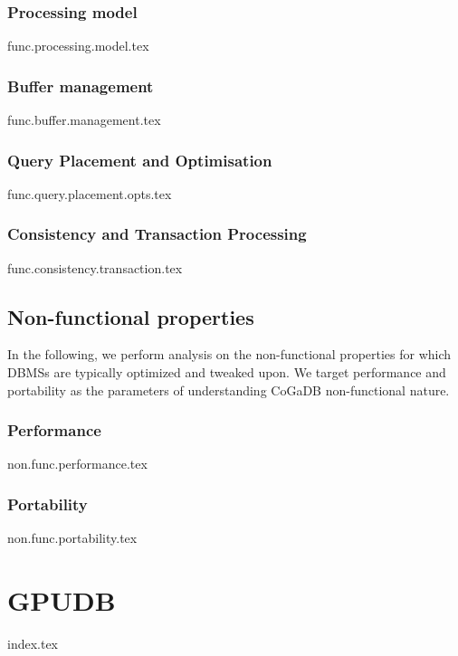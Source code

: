 \documentclass[a4paper, 11pt]{article}
\begin{document}
\subsubsection*{Processing model}
{func.processing.model.tex}

\subsubsection*{Buffer management}
{func.buffer.management.tex}

\subsubsection*{Query Placement and Optimisation}
{func.query.placement.opts.tex}

\subsubsection*{Consistency and Transaction Processing}
{func.consistency.transaction.tex}

\subsection*{Non-functional properties}
In the following, we perform analysis on the non-functional properties for which DBMSs are typically optimized and tweaked upon. We target performance and portability as the parameters of understanding CoGaDB non-functional nature.
\subsubsection*{Performance}
{non.func.performance.tex}

\subsubsection*{Portability}
{non.func.portability.tex}

\section*{GPUDB}
{index.tex}

\printbibliography
\end{document}
